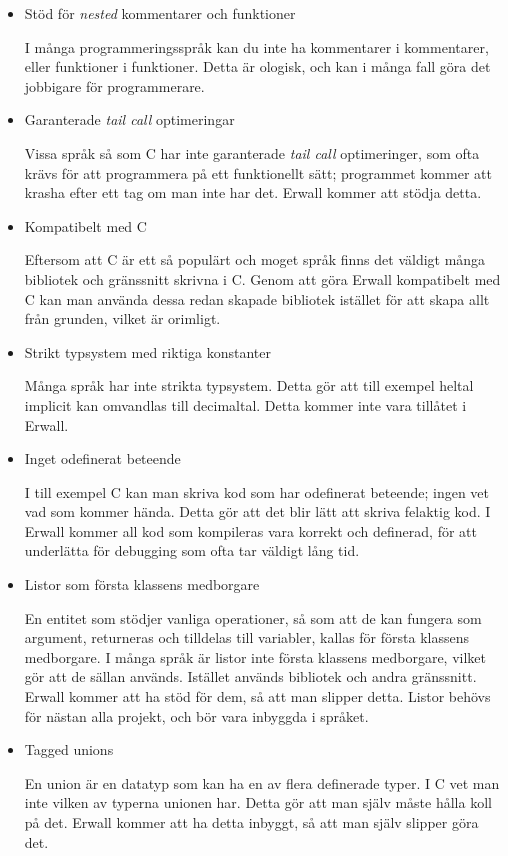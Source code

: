 \documentclass{theme}
\begin{document}
\begin{itemize}
	\item Stöd för \textit{nested} kommentarer och funktioner

		I många programmeringsspråk kan du inte ha kommentarer i kommentarer,
		eller funktioner i funktioner. Detta är ologisk, och kan i många fall
		göra det jobbigare för programmerare.

	\item Garanterade \textit{tail call} optimeringar

		Vissa språk så som C har inte garanterade \textit{tail call}
		optimeringer, som
		ofta krävs för att programmera på ett funktionellt sätt; programmet
		kommer att krasha efter ett tag om man inte har det. Erwall kommer
		att stödja detta.

	\item Kompatibelt med C

		Eftersom att C är ett så populärt och moget språk finns det väldigt
		många bibliotek och gränssnitt skrivna i C. Genom att göra Erwall
		kompatibelt med C kan man använda dessa redan skapade bibliotek istället
		för att skapa allt från grunden, vilket är orimligt.

	\item Strikt typsystem med riktiga konstanter

		Många språk har inte strikta typsystem. Detta gör att till exempel
		heltal implicit kan omvandlas till decimaltal. Detta kommer inte vara
		tillåtet i Erwall.

	\item Inget odefinerat beteende

		I till exempel C kan man skriva kod som har odefinerat beteende; ingen
		vet vad som kommer hända. Detta gör att det blir lätt att skriva
		felaktig kod. I Erwall kommer all kod som kompileras vara korrekt och
		definerad, för att underlätta för debugging som ofta tar väldigt lång
		tid.

	\item Listor som första klassens medborgare

		En entitet som stödjer vanliga operationer, så som att de kan fungera
		som argument, returneras och tilldelas till variabler, kallas för första
		klassens medborgare. I många språk är listor inte första klassens
		medborgare, vilket gör att de sällan används. Istället används bibliotek
		och andra gränssnitt. Erwall kommer att ha stöd för dem, så att man
		slipper detta. Listor behövs för nästan alla projekt, och bör vara
		inbyggda i språket.

	\item Tagged unions

		En union är en datatyp som kan ha en av flera definerade typer. I C
		vet man inte vilken av typerna unionen har. Detta gör att man själv
		måste hålla koll på det. Erwall kommer att ha detta inbyggt, så att
		man själv slipper göra det.

\end{itemize}
\end{document}
